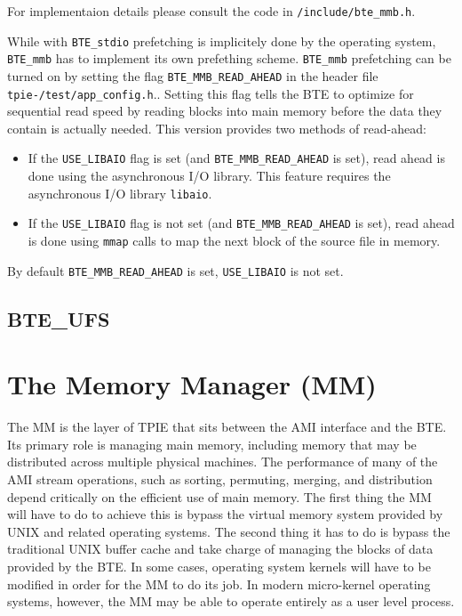 For implementaion details please consult the code in
\verb|/include/bte_mmb.h|.

While with \verb|BTE_stdio| prefetching is implicitely done by the
operating system, \verb|BTE_mmb| has to implement its own prefething
scheme. \verb|BTE_mmb| prefetching can be turned on by setting the flag
\verb|BTE_MMB_READ_AHEAD| in the header file {\tt
  tpie-\version/test/app\_config.h}..
Setting this flag tells the BTE to optimize for sequential read speed by
reading blocks into main memory before the data they contain is actually
needed. This version provides two methods of read-ahead:
\begin{itemize}
\item If the \verb|USE_LIBAIO| flag is set (and \verb|BTE_MMB_READ_AHEAD|
  is set), read ahead is done using the asynchronous I/O library.  This
  feature requires the asynchronous I/O library {\tt libaio}.
\item If the \verb|USE_LIBAIO| flag is not set (and
  \verb|BTE_MMB_READ_AHEAD| is set), read ahead is done using \verb|mmap|
  calls to map the next block of the source file in memory.
\end{itemize}

By default \verb|BTE_MMB_READ_AHEAD| is set, \verb|USE_LIBAIO| is not set.




\subsection{BTE\_UFS}



\section{The Memory Manager (MM)}
\label{sec:ref-mm}

The MM is the layer of TPIE that sits between the AMI interface and the
BTE.  Its primary role is managing main memory, including memory that
may be distributed across multiple physical machines.  The performance
of many of the AMI stream operations, such as sorting, permuting,
merging, and distribution depend critically on the efficient use of
main memory.  The first thing the MM will have to do to achieve this
is bypass the virtual memory system provided by UNIX and related
operating systems.  The second thing it has to do is bypass the
traditional UNIX buffer cache and take charge of managing the blocks
of data provided by the BTE.  In some cases, operating system kernels
will have to be modified in order for the MM to do its job.  In modern
micro-kernel operating systems, however, the MM may be able to operate
entirely as a user level process.

